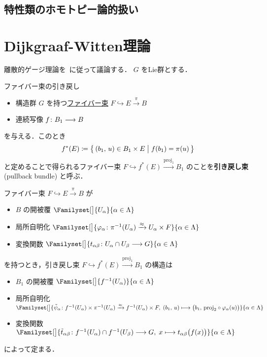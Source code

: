 \documentclass[TQFT_main]{subfiles}
\begin{document}
\subsection{特性類のホモトピー論的扱い}

\section{Dijkgraaf-Witten理論}

離散的ゲージ理論を~\cite{DijkgraafWitten1989}に従って議論する．
$G$ をLie群とする．

\begin{mydef}[label=def:pullback-bundle]{ファイバー束の引き戻し}
    \begin{itemize}
        \item 構造群 $G$ を持つ\hyperref[def.fiber-1]{ファイバー束} $F \hookrightarrow E \xrightarrow{\pi} B$
        \item 連続写像 $f \colon B_1 \longrightarrow B$
    \end{itemize}
    を与える．このとき
    \begin{align}
        f^* (E) \coloneqq \bigl\{\, (b_1,\, u) \in B_1 \times E \bigm| f(b_1) = \pi(u) \,\bigr\} 
    \end{align}
    と定めることで得られるファイバー束 $F \hookrightarrow f^*(E) \xrightarrow{\mathrm{proj}_1} B_1$ のことを\textbf{引き戻し束} (pullback bundle) と呼ぶ．
\end{mydef}
ファイバー束 $F \hookrightarrow E \xrightarrow{\pi} B$ が
\begin{itemize}
    \item $B$ の開被覆 $\Familyset[\big]{U_\alpha}{\alpha \in \Lambda}$
    \item 局所自明化 $\Familyset[\big]{\varphi_\alpha \colon \pi^{-1}(U_\alpha) \xrightarrow{\approx} U_\alpha \times F}{\alpha \in \Lambda}$
    \item 変換関数 $\Familyset[\big]{t_{\alpha \beta} \colon U_\alpha \cap U_\beta \lto G}{\alpha \in \Lambda}$
\end{itemize}
を持つとき，引き戻し束 $F \hookrightarrow f^*(E) \xrightarrow{\mathrm{proj_1}} B_1$ の構造は
\begin{itemize}
    \item $B_1$ の開被覆 $\Familyset[\big]{f^{-1}(U_\alpha)}{\alpha \in \Lambda}$
    \item 局所自明化 $\Familyset[\big]{\tilde{\psi}_\alpha \colon f^{-1}(U_\alpha) \times \pi^{-1}(U_\alpha) \xrightarrow{\approx} f^{-1}(U_\alpha) \times F,\; (b_1,\, u) \lmto \bigl(b_1,\, \mathrm{proj}_2 \circ \varphi_\alpha (u)\bigr)}{\alpha \in \Lambda}$
    \item 変換関数 $\Familyset[\big]{\tilde{t}_{\alpha \beta} \colon f^{-1}(U_\alpha) \cap f^{-1}(U_\beta) \lto G,\; x \lmto t_{\alpha\beta}\bigl(f(x)\bigr)}{\alpha \in \Lambda}$
\end{itemize}
によって定まる．
\end{document}
